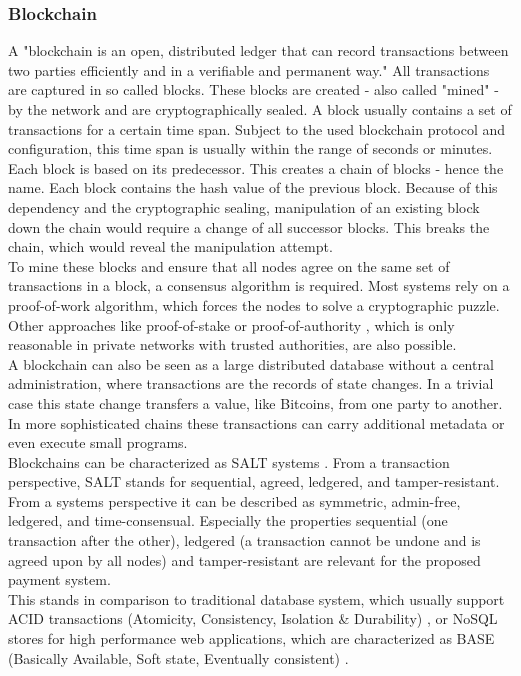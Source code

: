 \documentclass[a4paper,12pt]{scrartcl}
\begin{document}
\subsubsection{Blockchain}

A "blockchain is an open, distributed ledger that can record transactions between two parties efficiently and in a verifiable and permanent way." \cite{iansiti2017truth} All transactions are captured in so called blocks. These blocks are created - also called "mined" - by the network and are cryptographically sealed. A block usually contains a set of transactions for a certain time span. Subject to the used blockchain protocol and configuration, this time span is usually within the range of seconds or minutes. Each block is based on its predecessor. This creates a chain of blocks - hence the name. Each block contains the hash value of the previous block. Because of this dependency and the cryptographic sealing, manipulation of an existing block down the chain would require a change of all successor blocks. This breaks the chain, which would reveal the manipulation attempt.\\

To mine these blocks and ensure that all nodes agree on the same set of transactions in a block, a consensus algorithm is required. Most systems rely on a proof-of-work \cite{web47} algorithm, which forces the nodes to solve a cryptographic puzzle. Other approaches like proof-of-stake \cite{web47} or proof-of-authority \cite{web48}, which is only reasonable in private networks with trusted authorities, are also possible.\\

A blockchain can also be seen as a large distributed database without a central administration, where transactions are the records of state changes. In a trivial case this state change transfers a value, like Bitcoins, from one party to another. In more sophisticated chains these transactions can carry additional metadata or even execute small programs.\\

Blockchains can be characterized as SALT systems \cite{Tai2017}. From a transaction perspective, SALT stands for sequential, agreed, ledgered, and tamper-resistant. From a systems perspective it can be described as symmetric, admin-free, ledgered, and time-consensual. Especially the properties sequential (one transaction after the other), ledgered (a transaction cannot be undone and is agreed upon by all nodes) and tamper-resistant are relevant for the proposed payment system.\\
This stands in comparison to traditional database system, which usually support ACID transactions (Atomicity, Consistency, Isolation \& Durability) \cite{gray1992transaction}, or NoSQL stores for high performance web applications, which are characterized as BASE (Basically Available, Soft state, Eventually consistent) \cite{brewer2000towards}.\\
\end{document}
